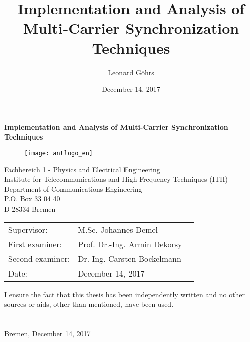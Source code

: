 \newcommand{\mytitle}{Implementation and Analysis of Multi-Carrier Synchronization Techniques}
\newcommand{\myname}{Leonard Göhrs}
\newcommand{\mysupervisor}{M.Sc. Johannes Demel}
\newcommand{\myexaminera}{Prof. Dr.-Ing. Armin Dekorsy}
\newcommand{\myexaminerb}{Dr.-Ing. Carsten Bockelmann}
\newcommand{\mysubdate}{December 14, 2017}

\thispagestyle{empty}
\title{\mytitle}
\author{\myname}
\date{\mysubdate}

\begin{titlepage}
  \noindent

  \vspace{55 mm}

  \begin{center}
    \begin{huge}
      \textbf{\mytitle}
    \end{huge}
  \end{center}

  \vspace{35 mm}

  \begin{figure}[H]
    \centering
    \texttt{[image: antlogo\_en]}
    \\
    \label{img:FrontPage}
  \end{figure}

  \begin{center}
    Fachbereich 1 - Physics and Electrical Engineering \\
    Institute for Telecommunications and High-Frequency Techniques (ITH) \\
    Department of Communications Engineering \\
    P.O. Box 33 04 40 \\
    D-28334 Bremen \\
  \end{center}

  \vfill

  \begin{center}
    \begin{tabular}{lll}
      Supervisor: & \mysupervisor \\
      First examiner: & \myexaminera \\
      Second examiner: & \myexaminerb \\
      Date: & \mysubdate
    \end{tabular}
  \end{center}

  \vspace{5mm}
  \noindent I ensure the fact that this thesis has been independently written and no other
  sources or aids, other than mentioned, have been used. \\ \\ \\
  Bremen, \mysubdate \hspace{5mm} \hrulefill

  \newpage
\end{titlepage}
